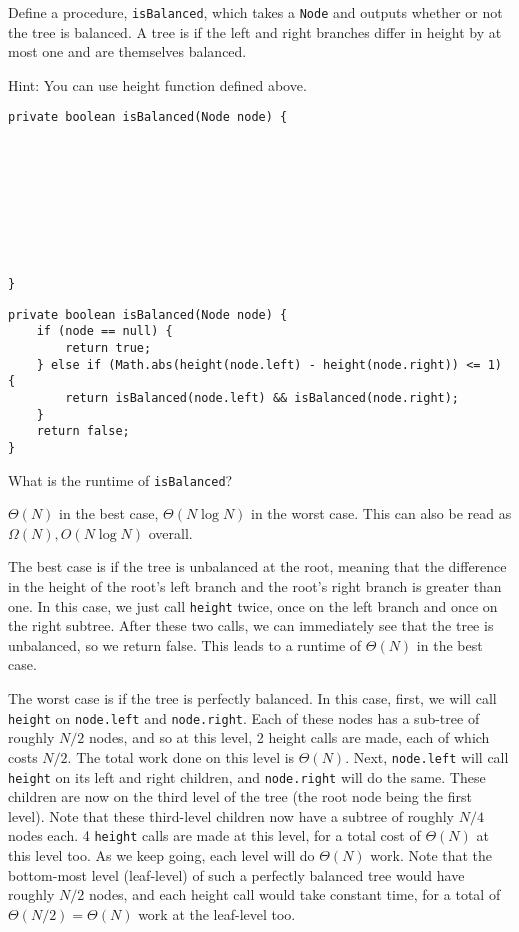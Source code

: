 \begin{blocksection}
\question Define a procedure, \lstinline$isBalanced$, which takes a
\lstinline$Node$ and outputs whether or not the tree is balanced. A tree is
 if the left and right branches differ in height by at most
one and are themselves balanced. 

Hint: You can use height function defined above. 

\ifprintanswers
\else
\begin{lstlisting}
private boolean isBalanced(Node node) {









}
\end{lstlisting}
\fi

\begin{solution}
\begin{lstlisting}
private boolean isBalanced(Node node) {
    if (node == null) {
        return true;
    } else if (Math.abs(height(node.left) - height(node.right)) <= 1) {
        return isBalanced(node.left) && isBalanced(node.right);
    }
    return false;
}
\end{lstlisting}
\end{solution}

What is the runtime of \lstinline$isBalanced$?
\begin{solution}[0.25in]
$\Theta(N)$ in the best case, $\Theta(N \log N)$ in the worst case.  This can
also be read as $\Omega(N), O(N \log N)$ overall.

The best case is if the tree is unbalanced at the root, meaning that the
difference in the height of the root's left branch and the root's right branch
is greater than one. In this case, we just call \lstinline$height$ twice, once
on the left branch and once on the right subtree. After these two calls, we can
immediately see that the tree is unbalanced, so we return false. This leads to
a runtime of $\Theta(N)$ in the best case.

The worst case is if the tree is perfectly balanced. In this case, first, we will call \lstinline$height$ 
on \lstinline$node.left$ and \lstinline$node.right$. Each of these nodes has a sub-tree of roughly $N/2$ nodes, 
and so at this level, 2 height calls are made, each of which costs $N/2$. The total work done on this level is
$\Theta(N)$. Next, \lstinline$node.left$ will call \lstinline$height$ on its left and right children, and \lstinline$node.right$ will do the same. These children are now on the third level of the tree (the root node being the first level). Note that these third-level children now have a subtree of roughly $N/4$ nodes each. 4 \lstinline$height$ calls are made at this level, for a total cost of $\Theta(N)$ at this level too. As we keep going, each level will do $\Theta(N)$ work. Note that the bottom-most level (leaf-level) of such a perfectly balanced tree would have roughly $N/2$ nodes, and each height call would take constant time, for a total of $\Theta(N/2) = \Theta(N)$ work at the leaf-level too. 


\end{solution}
\end{blocksection}
